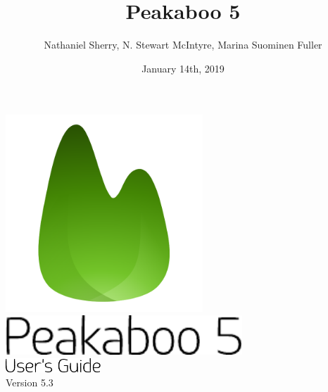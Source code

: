 \documentclass[article,twoside,11pt]{report}
\title{Peakaboo 5}
\date{January 14th, 2019}
\author{Nathaniel Sherry, N. Stewart McIntyre, Marina Suominen Fuller}
\begin{document}
\renewcommand{\headrulewidth}{0pt}
\lhead[]{}
\rhead[]{}


\pagestyle{empty}



\begin{titlepage}
	\vspace*{\fill}
	\centering
	\includegraphics[height=20em]{title/logo.pdf}\\
	\vspace*{1em}
	\includegraphics[height=4em]{title/peakaboo.pdf}\\
	\vspace*{1em}
	\includegraphics[height=1.5em]{title/usersguide.pdf}\\
	\vspace*{\fill}
	\vspace*{\fill}
	Version 5.3
\end{titlepage}

\cleardoublepage

\pagestyle{empty}
\setcounter{tocdepth}{1}
\tableofcontents
{}
\cleardoublepage
\setcounter{page}{1}
\pagestyle{fancyplain}
\end{document}

